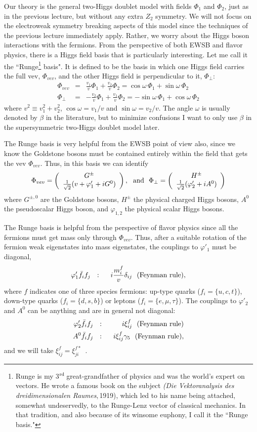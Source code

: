 \documentclass[12pt]{article}
\def\eeq{\end{eqnarray}}
\def\bea{\begin{eqnarray}}
\def\eea{\end{eqnarray}}
\def\vector#1#2{\left( \begin{array}{c}#1\\ #2\end{array}\right)}
\begin{document}
Our theory is the general two-Higgs doublet model with fields $\Phi_1$ and $\Phi_2$, just as in the previous lecture, but without any extra $Z_2$ symmetry. We will not focus on the electroweak symmetry breaking aspects of this model since the techniques of the previous lecture immediately apply. Rather, we worry about the Higgs boson interactions with the fermions. From the perspective of both EWSB and flavor physics, there is a Higgs field basis that is particularly interesting. Let me call it the ``Runge\footnote{Runge is my 3${}^{\rm rd}$\,great-grandfather of physics and was the world's expert on vectors. He wrote a famous book on the subject {\it  (Die Vektoranalysis des dreidimensionalen Raumes},\,1919), which led to his name being attached, somewhat undeservedly, to the Runge-Lenz vector of classical mechanics. In that tradition, and also because of its winsome euphony, I call it the ``Runge basis."} basis".
It is defined to be the basis in which one Higgs field carries the full vev, $\Phi_{vev}$, and the other Higgs field is perpendicular to it, $\Phi_\perp$:
\bea
\Phi_{vev}&=&\frac{v_1}{v}\Phi_1+\frac{v_2}{v}\Phi_2=\cos\omega\,\Phi_1+\sin\omega\,\Phi_2 \\
\Phi_\perp&=&-\frac{v_2}{v}\Phi_1+\frac{v_1}{v}\Phi_2=-\sin\omega\,\Phi_1+\cos\omega\,\Phi_2
\eea
where $v^2\equiv v^2_1+v^2_2$, $\cos\omega=v_1/v$ and $\sin\omega=v_2/v$.  The angle $\omega$ is usually denoted by $\beta$ in the literature, but to minimize confusions I want to only use $\beta$ in the supersymmetric two-Higgs doublet model later.

The Runge basis is very helpful from the EWSB point of view also, since we know the Goldstone bosons must be contained entirely within the field that gets the vev $\Phi_{vev}$. Thus, in this basis we can identify
\bea
\Phi_{vev}=\vector{G^\pm}{\frac{1}{\sqrt{2}}(v+\varphi'_1+iG^0)},~~{\rm and}~~
\Phi_{\perp}=\vector{H^\pm}{\frac{1}{\sqrt{2}}(\varphi'_2+iA^0)}
\eea
where $G^{\pm,0}$ are the Goldstone bosons, $H^\pm$ the physical charged Higgs bosons, $A^0$ the pseudoscalar Higgs boson, and $\varphi_{1,2}$ the physical scalar Higgs bosons.  

The Runge basis is helpful from the perspective of flavor physics since all the fermions must get mass only through $\Phi_{vev}$. Thus, after a suitable rotation of the fermion weak eigenstates into mass eigenstates, the couplings to $\varphi'_1$ must be diagonal,
\bea
\varphi'_1 \bar f_i f_j~~& : &~~ i \frac{m^f_{i}}{v}\delta_{ij}~~{\rm (Feynman~rule)},
\eeq
where $f$ indicates one of three species fermions: up-type quarks ($f_i=\{u,c,t\}$), down-type quarks ($f_i=\{d,s,b\}$) or leptons ($f_i=\{e,\mu,\tau\}$).
The couplings to $\varphi'_2$ and $A^0$ can be anything and are in general not diagonal:
\bea
\varphi'_2 \bar f_i f_j~~& : &~~ i \xi^f_{ij}~~{\rm (Feynman~rule)} \\
A^0\bar f_if_j ~~&:&~~i\xi^f_{ij}\gamma_5~~{\rm (Feynman~rule)},
\eea
and we will take $\xi_{ij}^f=\xi_{ji}^{f*}$~\cite{Atwood:1996vj}.
\end{document}
